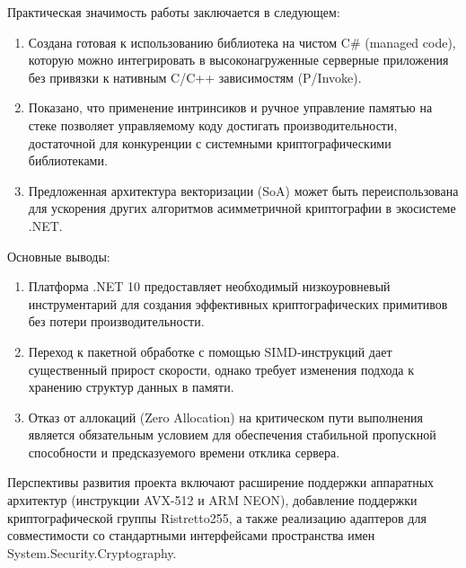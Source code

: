 Практическая значимость работы заключается в следующем:
\begin{enumerate}
    \item Создана готовая к использованию библиотека на чистом C\# (managed code), которую можно интегрировать в высоконагруженные серверные приложения без привязки к нативным C/C++ зависимостям (P/Invoke).
    \item Показано, что применение интринсиков и ручное управление памятью на стеке позволяет управляемому коду достигать производительности, достаточной для конкуренции с системными криптографическими библиотеками.
    \item Предложенная архитектура векторизации (SoA) может быть переиспользована для ускорения других алгоритмов асимметричной криптографии в экосистеме .NET.
\end{enumerate}

Основные выводы:
\begin{enumerate}
    \item Платформа .NET 10 предоставляет необходимый низкоуровневый инструментарий для создания эффективных криптографических примитивов без потери производительности.
    \item Переход к пакетной обработке с помощью SIMD-инструкций дает существенный прирост скорости, однако требует изменения подхода к хранению структур данных в памяти.
    \item Отказ от аллокаций (Zero Allocation) на критическом пути выполнения является обязательным условием для обеспечения стабильной пропускной способности и предсказуемого времени отклика сервера.
\end{enumerate}

Перспективы развития проекта включают расширение поддержки аппаратных архитектур (инструкции AVX-512 и ARM NEON), добавление поддержки криптографической группы Ristretto255, а также реализацию адаптеров для совместимости со стандартными интерфейсами пространства имен System.Security.Cryptography.